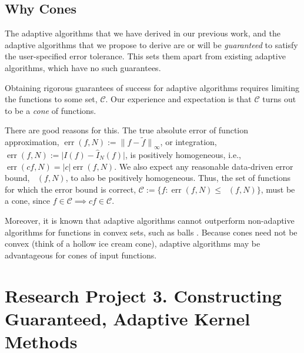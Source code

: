 \documentclass[11pt]{NSFamsart}
\newcommand{\hI}{\hat{I}}
\newcommand{\tf}{\tilde{f}}
\DeclareMathOperator{\err}{err}
\DeclareMathOperator{\oerr}{\overline{\err}}
\newcommand{\cb}{\mathcal{B}}
\newcommand{\calc}{{\mathcal{C}}}
\def\abs#1{\ensuremath{\left \lvert #1 \right \rvert}}
\newcommand{\bigabs}[1]{\ensuremath{\bigl \lvert #1 \bigr \rvert}}
\newcommand{\norm}[2][{}]{\ensuremath{\left \lVert #2 \right \rVert}_{#1}}
\newcommand{\bignorm}[2][{}]{\ensuremath{\bigl \lVert #2 \bigr \rVert}_{#1}}
\newcommand{\ch}{\mathcal{H}}
\begin{document}
\subsection*{Why Cones} The adaptive algorithms that we have derived in our previous work, and the adaptive algorithms that we propose to derive are or will be \emph{guaranteed} to satisfy the user-specified error tolerance.  This sets them apart from existing adaptive algorithms, which have no such guarantees.

Obtaining rigorous guarantees of success for adaptive algorithms requires limiting the functions to some set, $\calc$.  Our experience and expectation is that $\calc$ turns out to be a \emph{cone} of functions.

There are good reasons for this. The true absolute error of function approximation, $\err(f,N):=\bignorm[\infty]{f-\tf}$, or integration, $\err(f,N):= \bigabs{I(f) - \hI_N(f)}$, is positively homogeneous, i.e., $\err(cf,N)=\abs{c} \err(f,N)$. We also expect any reasonable data-driven error bound, $\oerr(f,N)$, to also be positively homogeneous.  Thus, the set of functions for which the error bound is correct, $\calc:=\{f : \err(f,N) \le \oerr(f,N)\}$, must be a cone, since $f\in \calc \implies cf \in \calc$.


Moreover, it is known that adaptive algorithms cannot outperform non-adaptive algorithms for functions in convex sets, such as balls \cite[Chapter 4, Theorem 5.2.1]{TraWasWoz88}. Because cones need not be convex (think of a hollow ice cream cone), adaptive algorithms may be advantageous for cones of input functions.

\section*{Research Project 3. Constructing Guaranteed, Adaptive Kernel Methods} \label{combinesec}
\end{document}
